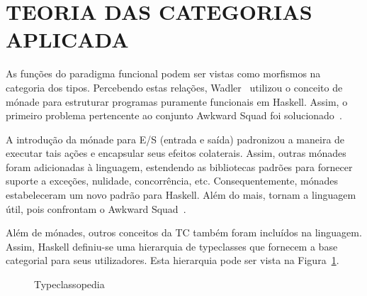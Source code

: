 \documentclass[10pt, conference]{IEEEtran}
\begin{document}
\bigskip

\section{TEORIA DAS CATEGORIAS APLICADA}

As funções do paradigma funcional podem ser vistas como morfismos na categoria dos tipos. Percebendo estas relações, Wadler~\cite{peyton1993imperative, wadler1995monads, wadler1992comprehending, wadler1992essence} utilizou o conceito de mónade para estruturar programas puramente funcionais em Haskell. Assim, o primeiro problema pertencente ao conjunto Awkward Squad foi solucionado~\cite{jones2001tacklingthe}.

A introdução da mónade para E/S (entrada e saída) padronizou a maneira de executar tais ações e encapsular seus efeitos colaterais. Assim, outras mónades foram adicionadas à linguagem, estendendo as bibliotecas padrões para fornecer suporte a exceções, nulidade, concorrência, etc. Consequentemente, mónades estabeleceram um novo padrão para Haskell. Além do mais, tornam a linguagem útil, pois confrontam o Awkward Squad~\cite{jones2001tacklingthe}.

Além de mónades, outros conceitos da TC também foram incluídos na linguagem. Assim, Haskell definiu-se uma hierarquia de typeclasses que fornecem a base categorial para seus utilizadores. Esta hierarquia pode ser vista na Figura~\ref{fig:typeclassopedia}.

\begin{figure}[h]
\centering
	\scalebox{.85}{
		
	}
	\bigskip
	\caption{Typeclassopedia}
	\label{fig:typeclassopedia}
\end{figure}



\end{document}
